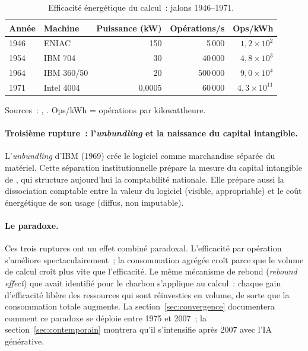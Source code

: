 \begin{table}[htbp]
\caption{Efficacité énergétique du calcul~: jalons 1946--1971.}\label{tab:efficacite-calcul}
\centering\small
\renewcommand{\arraystretch}{1.15}
\begin{tabular}{@{}llrrr@{}}
\toprule
\textbf{Année} & \textbf{Machine} & \textbf{Puissance (kW)} & \textbf{Opérations/s} & \textbf{Ops/kWh} \\
\midrule
1946 & ENIAC & 150 & 5\,000 & $1{,}2 \times 10^{2}$ \\
1954 & IBM 704 & 30 & 40\,000 & $4{,}8 \times 10^{3}$ \\
1964 & IBM 360/50 & 20 & 500\,000 & $9{,}0 \times 10^{4}$ \\
1971 & Intel 4004 & 0,0005 & 60\,000 & $4{,}3 \times 10^{11}$ \\
\bottomrule
\end{tabular}
\renewcommand{\arraystretch}{1.0}
\par\smallskip
\footnotesize Sources~: \textcite{nordhaus_two_2007}, \textcite{koomey_implications_2011}. Ops/kWh = opérations par kilowattheure.
\end{table}

\paragraph{Troisième rupture~: l'\emph{unbundling} et la naissance du capital intangible.} L'\emph{unbundling} d'IBM (1969) crée le logiciel comme marchandise séparée du matériel. Cette séparation institutionnelle prépare la mesure du capital intangible de \textcite{corrado_intangible_2005}, qui structure aujourd'hui la comptabilité nationale. Elle prépare aussi la dissociation comptable entre la valeur du logiciel (visible, appropriable) et le coût énergétique de son usage (diffus, non imputable).

%
\paragraph{Le paradoxe.} Ces trois ruptures ont un effet combiné paradoxal. L'efficacité par opération s'améliore spectaculairement~; la consommation agrégée croît parce que le volume de calcul croît plus vite que l'efficacité. Le même mécanisme de rebond (\emph{rebound effect}) que \textcite{jevons_coal_1865} avait identifié pour le charbon s'applique au calcul~: chaque gain d'efficacité libère des ressources qui sont réinvesties en volume, de sorte que la consommation totale augmente. La section~\ref{sec:convergence} documentera comment ce paradoxe se déploie entre 1975 et 2007~; la section~\ref{sec:contemporain} montrera qu'il s'intensifie après 2007 avec l'IA générative.

